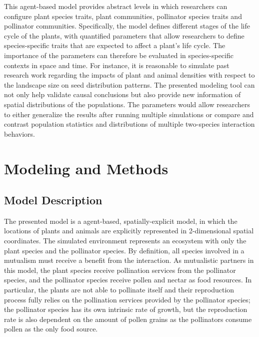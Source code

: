 \documentclass[3p,,preprint,12pt]{elsarticle}
\begin{document}
This agent-based model provides abstract levels in which researchers can configure plant species traits, plant communities, pollinator species traits and pollinator communities. Specifically, the model defines different stages of the life cycle of the plants, with quantified parameters that allow researchers to define species-specific traits that are expected to affect a plant’s life cycle. The importance of the parameters can therefore be evaluated in species-specific contexts in space and time. For instance, it is reasonable to simulate past research work regarding the impacts of plant and animal densities with respect to the landscape size on seed distribution patterns\cite{Obsie2020}. The presented modeling tool can not only help validate causal conclusions but also provide new information of spatial distributions of the populations. The parameters would allow researchers to either generalize the results after running multiple simulations or compare and contrast population statistics and distributions of multiple two-species interaction behaviors.


\section{Modeling and Methods}

\subsection{Model Description}
The presented model is a agent-based, spatially-explicit model, in which the locations of plants and animals are explicitly represented in 2-dimensional spatial coordinates. The simulated environment represents an ecosystem with only the plant species and the pollinator species. By definition, all species involved in a mutualism must receive a benefit from the interaction. As mutualistic partners in this model, the plant species receive pollination services from the pollinator species, and the pollinator species receive pollen and nectar as food resources. In particular, the plants are not able to pollinate itself and their reproduction process fully relies on the pollination services provided by the pollinator species; the pollinator species has its own intrinsic rate of growth, but the reproduction rate is also dependent on the amount of pollen grains as the pollinators consume pollen as the only food source.
\end{document}
